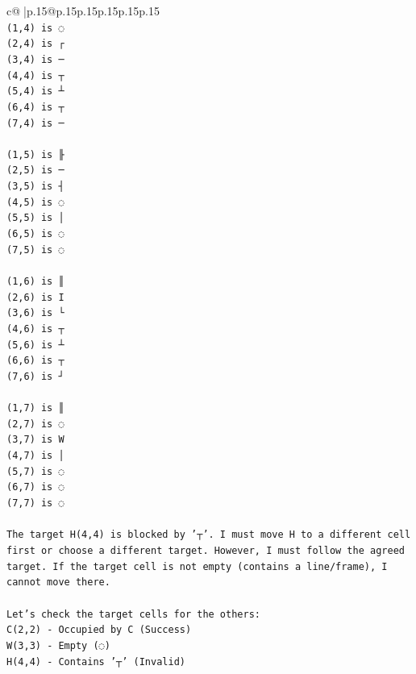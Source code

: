 \documentclass{article}
\begin{document}
{\begin{supertabular}{c@{$\;$}|p{.15\linewidth}@{}p{.15\linewidth}p{.15\linewidth}p{.15\linewidth}p{.15\linewidth}p{.15\linewidth}}
{{{\\ 
\texttt{(1,4) is ◌} \\
\texttt{(2,4) is ┌} \\
\texttt{(3,4) is ─} \\
\texttt{(4,4) is ┬} \\
\texttt{(5,4) is ┴} \\
\texttt{(6,4) is ┬} \\
\texttt{(7,4) is ─} \\
\\ 
\texttt{(1,5) is ╟} \\
\texttt{(2,5) is ─} \\
\texttt{(3,5) is ┤} \\
\texttt{(4,5) is ◌} \\
\texttt{(5,5) is │} \\
\texttt{(6,5) is ◌} \\
\texttt{(7,5) is ◌} \\
\\ 
\texttt{(1,6) is ║} \\
\texttt{(2,6) is I} \\
\texttt{(3,6) is └} \\
\texttt{(4,6) is ┬} \\
\texttt{(5,6) is ┴} \\
\texttt{(6,6) is ┬} \\
\texttt{(7,6) is ┘} \\
\\ 
\texttt{(1,7) is ║} \\
\texttt{(2,7) is ◌} \\
\texttt{(3,7) is W} \\
\texttt{(4,7) is │} \\
\texttt{(5,7) is ◌} \\
\texttt{(6,7) is ◌} \\
\texttt{(7,7) is ◌} \\
\\ 
\texttt{The target H(4,4) is blocked by '┬'. I must move H to a different cell first or choose a different target. However, I must follow the agreed target. If the target cell is not empty (contains a line/frame), I cannot move there.} \\
\\ 
\texttt{Let's check the target cells for the others:} \\
\texttt{C(2,2) {-} Occupied by C (Success)} \\
\texttt{W(3,3) {-} Empty (◌)} \\
\texttt{H(4,4) {-} Contains '┬' (Invalid)} \\
}}}
\end{supertabular}}
\end{document}
